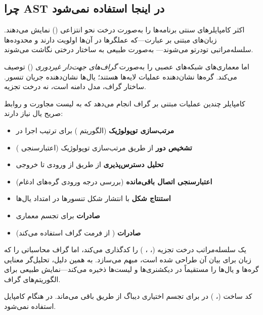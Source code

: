 \documentclass{nngraph-fa}
\begin{document}
\subsection{چرا AST در اینجا استفاده نمی‌شود}

اکثر کامپایلرهای سنتی برنامه‌ها را به‌صورت درخت نحو انتزاعی
() نمایش می‌دهند. زبان‌های مبتنی بر عبارت---که عملگرها
در آن‌ها اولویت دارند و محدوده‌ها سلسله‌مراتبی تودرتو می‌شوند---
به‌صورت طبیعی به ساختار درختی نگاشت می‌شوند.

اما  معماری‌های شبکه‌های عصبی را به‌صورت
\emph{گراف‌های جهت‌دار غیردوری} () توصیف می‌کند. گره‌ها
نشان‌دهنده عملیات لایه‌ها هستند؛ یال‌ها نشان‌دهنده جریان تنسور.
ساختار گراف، مدل دامنه است، نه درخت تجزیه.

کامپایلر چندین عملیات مبتنی بر گراف انجام می‌دهد که به لیست
مجاورت و روابط صریح یال نیاز دارند:

\begin{itemize}[noitemsep]
    \item \textbf{مرتب‌سازی توپولوژیک} (الگوریتم ) برای
    ترتیب اجرا در 
    \item \textbf{تشخیص دور} از طریق مرتب‌سازی توپولوژیک (اعتبارسنجی )
    \item \textbf{تحلیل دسترس‌پذیری} از طریق  از ورودی تا خروجی
    \item \textbf{اعتبارسنجی اتصال باقی‌مانده} (بررسی درجه ورودی
    گره‌های ادغام)
    \item \textbf{استنتاج شکل} با انتشار شکل تنسورها در امتداد یال‌ها
    \item \textbf{صادرات } برای تجسم معماری
    \item \textbf{صادرات } ( از فرمت گراف استفاده می‌کند)
\end{itemize}

یک  سلسله‌مراتب درخت تجزیه (،
، ) را کدگذاری می‌کند، اما
گراف محاسباتی را که زبان برای بیان آن طراحی شده است، مبهم می‌سازد.
به همین دلیل، تحلیل‌گر معنایی گره‌ها و یال‌ها را مستقیماً در دیکشنری‌ها
و لیست‌ها ذخیره می‌کند---نمایش طبیعی برای الگوریتم‌های گراف.

\begin{notebox}
کد ساخت  (، ) در
 برای تجسم اختیاری دیباگ از طریق
 باقی می‌ماند. در هنگام کامپایل استفاده نمی‌شود.
\end{notebox}
\end{document}
